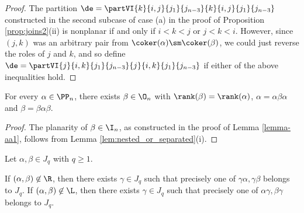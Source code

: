 \begin{proof} 
The partition $\de=\partVI{k}{i,j}{j_1}{j_{n-3}}{k}{i,j}{j_1}{j_{n-3}}$ constructed in the second subcase of case (a) in the proof of Proposition \ref{prop:joins2}(ii) is nonplanar if and only if $i<k<j$ or $j<k<i$.  However, since $(j,k)$ was an arbitrary pair from $\coker(\alpha)\sm\coker(\beta)$, we could just reverse the roles of $j$ and $k$, and so define $\de=\partVI{j}{i,k}{j_1}{j_{n-3}}{j}{i,k}{j_1}{j_{n-3}}$ if either of the above inequalities hold.   \end{proof}


\begin{lemma}
\label{lemma-aa1:PPn}
For every $\alpha\in\PP_n$, there exists $\beta\in\O_n$ with $\rank(\beta)=\rank(\alpha)$, $\alpha=\alpha\beta\alpha$ and $\beta=\beta\alpha\beta$.
\end{lemma}

\begin{proof}
The planarity of $\beta\in\I_n$, as constructed in the proof of Lemma \ref{lemma-aa1}, follows from Lemma \ref{lem:nested_or_separated}(i).
\end{proof}


\begin{lemma}
\label{lemma-aa1b:PPn}
Let $\alpha,\beta\in J_q$ with $q\geq1$.  
\begin{itemize}
 If $(\alpha,\beta)\not\in{\R}$, then there exists $\gamma\in J_q$ such that precisely one of $\gamma\alpha,\gamma\beta$ belongs to $J_q$.
 If $(\alpha,\beta)\not\in{\L}$, then there exists $\gamma\in J_q$ such that precisely one of $\alpha\gamma,\beta\gamma$ belongs to $J_q$.
\end{itemize}
\end{lemma}

